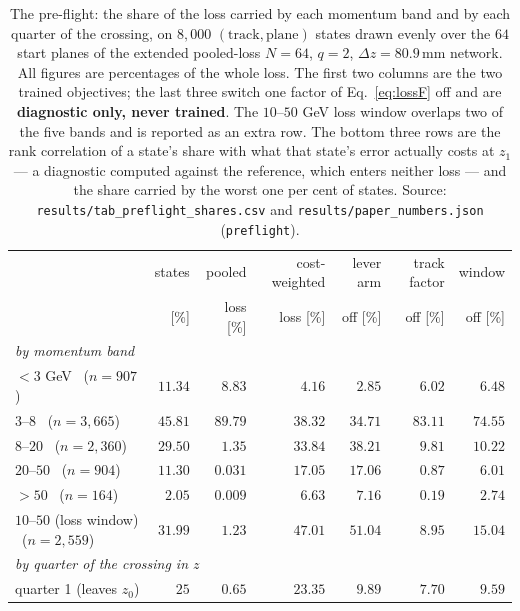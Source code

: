 \documentclass[11pt,a4paper]{article}
\newcommand{\mm}{\ensuremath{\,\mathrm{mm}}}
\begin{document}
\begin{table}[tbp]
  \centering
  \caption{The pre-flight: the share of the loss carried by each momentum band
  and by each quarter of the crossing, on $8{,}000$ $(\text{track},
  \text{plane})$ states drawn evenly over the $64$ start planes of the extended
  pooled-loss $N = 64$, $q = 2$, $\Delta z = 80.9\mm$ network. All figures are
  percentages of the whole loss. The first two columns are the two trained
  objectives; the last three switch one factor of Eq.~\eqref{eq:lossF} off and
  are \textbf{diagnostic only, never trained}. The $10$--$50$ GeV loss window
  overlaps two of the five bands and is reported as an extra row. The bottom
  three rows are the rank correlation of a state's share with what that state's
  error actually costs at $z_1$ --- a diagnostic computed against the reference,
  which enters neither loss --- and the share carried by the worst one per cent
  of states. Source: \texttt{results/tab\_preflight\_shares.csv} and
  \texttt{results/paper\_numbers.json} (\texttt{preflight}).}
  \label{tab:preflight}
  \footnotesize
  \setlength{\tabcolsep}{5pt}
  \begin{tabular}{lrrrrrr}
    \toprule
    & states & pooled & cost-weighted & lever arm & track factor & window \\
    & [\%] & loss [\%] & loss [\%] & off [\%] & off [\%] & off [\%] \\
    \midrule
    \multicolumn{7}{l}{\emph{by momentum band}}\\
    $<3$ GeV \ ($n = 907$)            & $11.34$ & $8.83$  & $4.16$  & $2.85$  & $6.02$  & $6.48$ \\
    $3$--$8$ \ ($n = 3{,}665$)        & $45.81$ & $89.79$ & $38.32$ & $34.71$ & $83.11$ & $74.55$ \\
    $8$--$20$ \ ($n = 2{,}360$)       & $29.50$ & $1.35$  & $33.84$ & $38.21$ & $9.81$  & $10.22$ \\
    $20$--$50$ \ ($n = 904$)          & $11.30$ & $0.031$ & $17.05$ & $17.06$ & $0.87$  & $6.01$ \\
    $>50$ \ ($n = 164$)               & $2.05$  & $0.009$ & $6.63$  & $7.16$  & $0.19$  & $2.74$ \\
    $10$--$50$ (loss window) \ ($n = 2{,}559$) & $31.99$ & $1.23$ & $47.01$ & $51.04$ & $8.95$ & $15.04$ \\
    \midrule
    \multicolumn{7}{l}{\emph{by quarter of the crossing in $z$}}\\
    quarter 1 (leaves $z_0$)          & $25$ & $0.65$  & $23.35$ & $9.89$  & $7.70$  & $9.59$ \\

\end{tabular}
\end{table}
\end{document}

